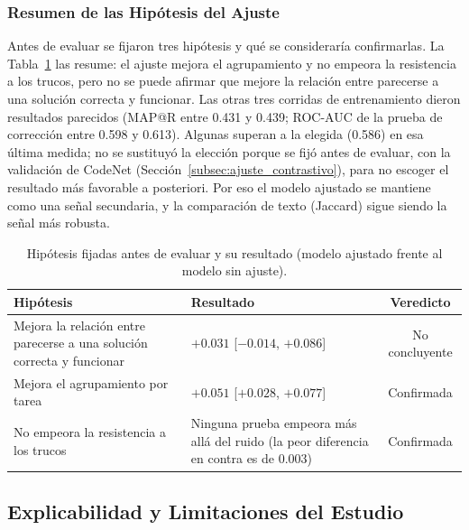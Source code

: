 \subsubsection{Resumen de las Hipótesis del Ajuste}
\label{subsec:resultados_ajuste}
Antes de evaluar se fijaron tres hipótesis y qué se consideraría confirmarlas. La Tabla~\ref{tab:veredictos_ajuste} las resume: el ajuste mejora el agrupamiento y no empeora la resistencia a los trucos, pero no se puede afirmar que mejore la relación entre parecerse a una solución correcta y funcionar. Las otras tres corridas de entrenamiento dieron resultados parecidos (MAP@R entre 0.431 y 0.439; ROC-AUC de la prueba de corrección entre 0.598 y 0.613). Algunas superan a la elegida (0.586) en esa última medida; no se sustituyó la elección porque se fijó antes de evaluar, con la validación de CodeNet (Sección~\ref{subsec:ajuste_contrastivo}), para no escoger el resultado más favorable a posteriori. Por eso el modelo ajustado se mantiene como una señal secundaria, y la comparación de texto (Jaccard) sigue siendo la señal más robusta.

\begin{table}[H]
    \centering
    \caption{Hipótesis fijadas antes de evaluar y su resultado (modelo ajustado frente al modelo sin ajuste).}
    \label{tab:veredictos_ajuste}
    \renewcommand{\arraystretch}{1.2}
    \small
    \begin{tabularx}{\textwidth}{|X|X|c|}
        \hline
        \textbf{Hipótesis} & \textbf{Resultado} & \textbf{Veredicto} \\ \hline
        Mejora la relación entre parecerse a una solución correcta y funcionar & $+0.031$ [$-0.014$, $+0.086$] & No concluyente \\ \hline
        Mejora el agrupamiento por tarea & $+0.051$ [$+0.028$, $+0.077$] & Confirmada \\ \hline
        No empeora la resistencia a los trucos & Ninguna prueba empeora más allá del ruido (la peor diferencia en contra es de $0.003$) & Confirmada \\ \hline
    \end{tabularx}
\end{table}

\subsection{Explicabilidad y Limitaciones del Estudio}
\label{subsec:explicabilidad}
\label{subsec:limitaciones}

